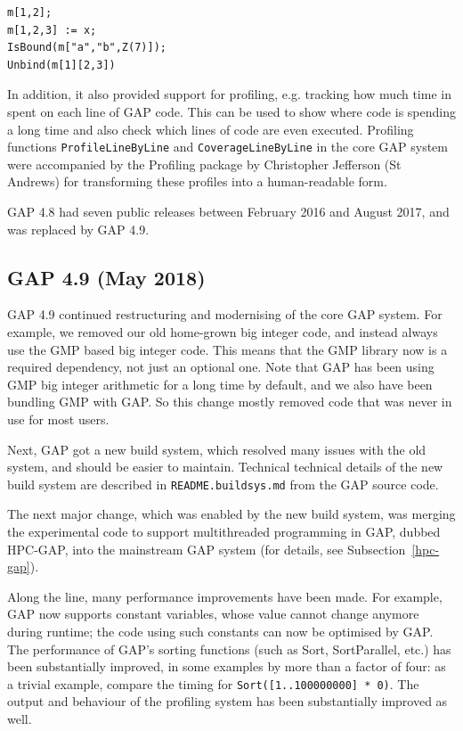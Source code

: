 \documentclass{deliverablereport}
\begin{document}
{\small
\begin{verbatim}
m[1,2];
m[1,2,3] := x;
IsBound(m["a","b",Z(7)]);
Unbind(m[1][2,3])
\end{verbatim}
}

In addition, it also provided 
support for profiling, e.g. tracking how much time in spent on 
each line of GAP code. This can be used to show where code is spending 
a long time and also check which lines of code are even executed. Profiling
functions \verb|ProfileLineByLine| and \verb|CoverageLineByLine| in the core 
GAP system were accompanied by the {\sf Profiling} package by Christopher Jefferson 
(St Andrews) for transforming these profiles into a human-readable form.

GAP 4.8 had seven public releases between February 2016 and August 2017, and
was replaced by GAP 4.9.

\subsection{GAP 4.9 (May 2018)}\label{gap-4.9}

GAP 4.9 continued restructuring and modernising of the core GAP system.
For example, we removed our old home-grown big integer code, and instead always 
use the GMP based big integer code. This means that the GMP library 
now is a required dependency, not just an optional one. Note that GAP 
has been using GMP big integer arithmetic for a long time by default, 
and we also have been bundling GMP with GAP. So this change mostly 
removed code that was never in use for most users.

Next, GAP got a new build system, which resolved many issues with the old
system, and should be easier to maintain. Technical technical details
of the new build system are described in {\tt README.buildsys.md} from
the GAP source code. 

The next major change, which was enabled by the new build system, was 
merging the experimental code to support multithreaded programming in GAP, 
dubbed HPC-GAP, into the mainstream GAP system (for details, see
Subsection~\ref{hpc-gap}).

Along the line, many performance improvements have been made. For example,
GAP now supports constant variables, whose value cannot change anymore 
during runtime; the code using such constants can now be optimised by GAP.
The performance of GAP's sorting functions (such as Sort, SortParallel, 
etc.) has been substantially improved, in some examples by more than a 
factor of four: as a trivial example, compare the timing for 
{\tt Sort([1..100000000] * 0)}. %
The output and behaviour of the profiling system has been substantially improved
as well.
\end{document}
